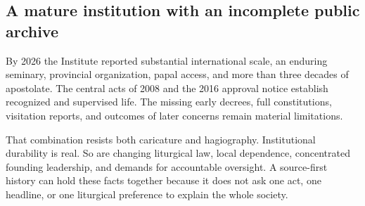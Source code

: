 
\subsection{A mature institution with an incomplete public archive}

By 2026 the Institute reported substantial international scale, an enduring seminary, provincial organization, papal access, and more than three decades of apostolate. The central acts of 2008 and the 2016 approval notice establish recognized and supervised life. The missing early decrees, full constitutions, visitation reports, and outcomes of later concerns remain material limitations.

That combination resists both caricature and hagiography. Institutional durability is real. So are changing liturgical law, local dependence, concentrated founding leadership, and demands for accountable oversight. A source-first history can hold these facts together because it does not ask one act, one headline, or one liturgical preference to explain the whole society.
